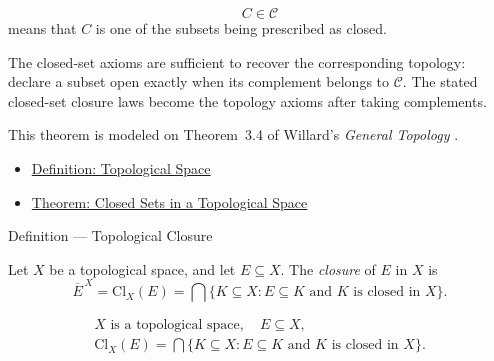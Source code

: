 \begin{remark*}
\[
C\in\mathcal{C}
\]
means that \(C\) is one of the subsets being prescribed as closed.
\end{remark*}

\begin{remark*}[Interpretation]
The closed-set axioms are sufficient to recover the corresponding topology:
declare a subset open exactly when its complement belongs to
\(\mathcal{C}\).  The stated closed-set closure laws become the topology
axioms after taking complements.
\end{remark*}

\begin{remark*}
This theorem is modeled on Theorem~3.4 of Willard's
\emph{General Topology} \cite{WillardGeneralTopology}.
\end{remark*}


\begin{dependencies}
\begin{itemize}
  \item \hyperref[def:topological-space]{Definition: Topological Space}
  \item \hyperref[thm:closed-sets-in-topological-space]{Theorem: Closed Sets in a Topological Space}
\end{itemize}
\end{dependencies}

\begin{definitionbox}{Definition --- Topological Closure}
\begin{definition}\label{def:topological-closure}
Let \(X\) be a topological space, and let \(E\subseteq X\).  The
\emph{closure} of \(E\) in \(X\) is
\[
\overline{E}^{\,X}
=
\mathrm{Cl}_{X}(E)
=
\bigcap\{K\subseteq X:E\subseteq K\text{ and }K\text{ is closed in }X\}.
\]
\end{definition}
\end{definitionbox}

\begin{remark*}
\[
\begin{gathered}
X\text{ is a topological space},\quad E\subseteq X,\\
\mathrm{Cl}_{X}(E)
=
\bigcap\{K\subseteq X:E\subseteq K\text{ and }K\text{ is closed in }X\}.
\end{gathered}
\]
\end{remark*}


